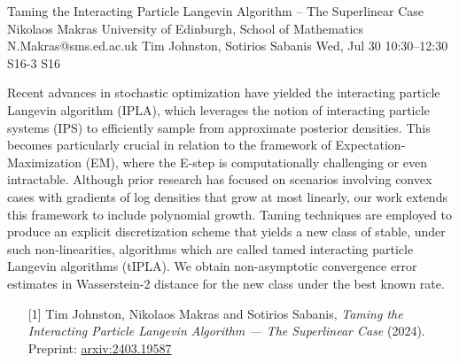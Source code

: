 \begin{talk}
  {Taming the Interacting Particle Langevin Algorithm – The Superlinear Case}%
  {Nikolaos Makras}%
  {University of Edinburgh, School of Mathematics}%
  {N.Makras@sms.ed.ac.uk}%
  {Tim Johnston, Sotirios Sabanis}%
  {}%
  {Wed, Jul 30 10:30–12:30}%
  {S16-3}%
  {S16}%
  
				
			
Recent advances in stochastic optimization have yielded the interacting particle Langevin algorithm (IPLA), which leverages the notion of interacting particle systems (IPS) to efficiently sample from approximate posterior densities. This becomes particularly crucial in relation to the framework of Expectation-Maximization (EM), where the E-step is computationally challenging or even intractable. Although prior research has focused on scenarios involving convex cases with gradients of log densities that grow at most linearly, our work extends this framework to include polynomial growth. Taming techniques are employed to produce an explicit discretization scheme that yields a new class of stable, under such non-linearities, algorithms which are called tamed interacting particle Langevin algorithms (tIPLA). We obtain non-asymptotic convergence error estimates in Wasserstein-2 distance for the new class under the best known rate. 

\medskip

\begin{enumerate}
	\item[{[1]}] Tim Johnston, Nikolaos Makras and Sotirios Sabanis, {\it Taming the Interacting Particle Langevin Algorithm --- The Superlinear Case} (2024). Preprint: \href{https://arxiv.org/abs/2403.19587}{arxiv:2403.19587} 
\end{enumerate}

\end{talk}

